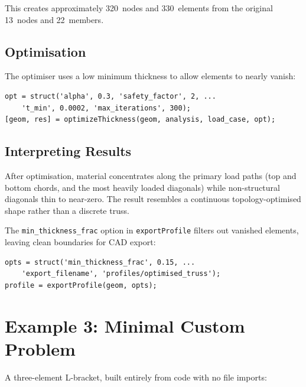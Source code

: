 This creates approximately 320~nodes and 330~elements from the original
13~nodes and 22~members.

\subsection{Optimisation}

The optimiser uses a low minimum thickness to allow elements to nearly
vanish:

\begin{lstlisting}[caption={Truss optimisation settings.}]
opt = struct('alpha', 0.3, 'safety_factor', 2, ...
    't_min', 0.0002, 'max_iterations', 300);
[geom, res] = optimizeThickness(geom, analysis, load_case, opt);
\end{lstlisting}

\subsection{Interpreting Results}

After optimisation, material concentrates along the primary load paths
(top and bottom chords, and the most heavily loaded diagonals) while
non-structural diagonals thin to near-zero.  The result resembles a
continuous topology-optimised shape rather than a discrete truss.

The \texttt{min\_thickness\_frac} option in \texttt{exportProfile} filters
out vanished elements, leaving clean boundaries for CAD export:

\begin{lstlisting}[caption={Exporting the truss profile.}]
opts = struct('min_thickness_frac', 0.15, ...
    'export_filename', 'profiles/optimised_truss');
profile = exportProfile(geom, opts);
\end{lstlisting}

\section{Example 3: Minimal Custom Problem}
\label{sec:ex:custom}

A three-element L-bracket, built entirely from code with no file imports:

